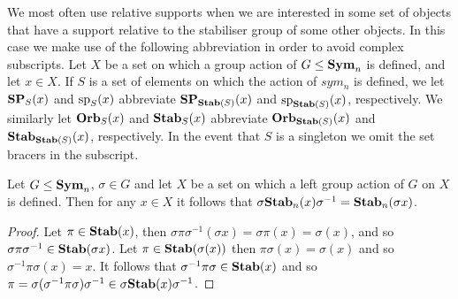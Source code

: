 \documentclass[../paper.tex]{subfiles}
\begin{document}
We most often use relative supports when we are interested in some set of
objects that have a support relative to the stabiliser group of some other
objects. In this case we make use of the following abbreviation in order to
avoid complex subscripts. Let $X$ be a set on which a group action of $G \leq
\text{\textbf{Sym}}_n$ is defined, and let $x \in X$. If $S$ is a set of elements on which the
action of $sym_n$ is defined, we let $\text{\textbf{SP}}_S(x)$ and $\text{sp}_S(x)$ abbreviate
$\text{\textbf{SP}}_{\text{\textbf{Stab}}(S)}(x)$ and $\text{sp}_{\text{\textbf{Stab}}(S)}(x)$, respectively. We similarly let
$\text{\textbf{Orb}}_S(x)$ and $\text{\textbf{Stab}}_S(x)$ abbreviate $\text{\textbf{Orb}}_{\text{\textbf{Stab}}(S)}(x)$ and
$\text{\textbf{Stab}}_{\text{\textbf{Stab}}(S)}(x)$, respectively. In the event that $S$ is a singleton we
omit the set bracers in the subscript.




\begin{lem}
  \label{lem:stab_conjugation}
  Let $G \leq \text{\textbf{Sym}}_n$, $\sigma \in G$ and let $X$ be a set on which a left group
  action of $G$ on $X$ is defined. Then for any $x \in X$ it follows that
  $\sigma \text{\textbf{Stab}}_n (x) \sigma^{-1} = \text{\textbf{Stab}}_n(\sigma x)$.
\end{lem}

\begin{proof}
  Let $\pi \in \text{\textbf{Stab}}(x)$, then $\sigma \pi \sigma^{-1}(\sigma x) = \sigma \pi
  (x) = \sigma (x)$, and so $\sigma \pi \sigma^{-1} \in \text{\textbf{Stab}}(\sigma x)$. Let
  $\pi \in \text{\textbf{Stab}}(\sigma (x))$ then $\pi \sigma (x) = \sigma (x)$ and so
  $\sigma^{-1} \pi \sigma (x) = x$. It follows that $\sigma^{-1} \pi \sigma \in
  \text{\textbf{Stab}}(x)$ and so $\pi = \sigma (\sigma^{-1} \pi \sigma) \sigma ^{-1} \in
  \sigma \text{\textbf{Stab}}(x) \sigma^{-1}$.
\end{proof}
\end{document}
